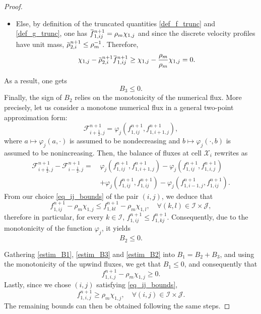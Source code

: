 \documentclass[reqno]{amsart}
\newcommand{\II}{\mathcal{I}}
\newcommand{\J}{\mathcal{J}}
\newcommand{\iph}{{i+\frac{1}{2}}}
\newcommand{\imh}{{i-\frac{1}{2}}}
\newcommand{\inv}{^{-1}}
\newcommand{\overbar}[1]{\mkern 1.5mu\overline{\mkern-1.5mu#1\mkern-1.5mu}\mkern 1.5mu}
\numberwithin{equation}{section}
\begin{document}
\begin{proof}
\begin{itemize}
        \item Else, by definition of the truncated quantities \eqref{def_f_trunc} and \eqref{def_g_trunc}, one has $\overbar{f}_{1,ij}^{n+1} = \rho_m\chi_{1,j}$ and since the discrete velocity profiles have unit mass, $\overbar{\rho}_{2,i}^{n+1}\leq\rho_m\inv$. Therefore, 
        \begin{equation*}
            \chi_{1,j}-\overbar{\rho}_{2,i}^{n+1}\overbar{f}_{1,ij}^{n+1} \geq \chi_{1,j}-\frac{\rho_m}{\rho_m}\chi_{1,j}= 0.
        \end{equation*}
    \end{itemize}
    As a result, one gets
    \begin{equation}\label{estim_B3}
        B_3\leq 0.
    \end{equation}
    Finally, the sign of $B_2$ relies on the monotonicity of the numerical flux. More precisely, let us consider a monotone numerical flux in a general two-point approximation form: 
    \begin{equation*}
        \mathcal{F}_{\iph,j}^{n+1}=\varphi_j(f_{1,ij}^{n+1},f_{1,i+1,j}^{n+1}),
    \end{equation*}
    where $a\mapsto \varphi_j(a,\cdot)$ is assumed to be nondecreasing and $b\mapsto \varphi_j(\cdot,b)$ is assumed to be nonincreasing. Then, the balance of fluxes at cell $\mathcal{X}_i$ rewrites as
    \begin{align}\label{eq_fluxmono_varphi}
        \mathcal{F}_{\iph,j}^{n+1}-\mathcal{F}_{\imh,j}^{n+1}=\, &\varphi_j(f_{1,ij}^{n+1},f_{1,i+1,j}^{n+1}) - \varphi_j(f_{1,ij}^{n+1},f_{1,i,j}^{n+1})\nonumber\\
        & + \varphi_j(f_{1,ij}^{n+1},f_{1,ij}^{n+1}) - \varphi_j(f_{1,i-1,j}^{n+1},f_{1,ij}^{n+1}).
    \end{align}
    From our choice \eqref{eq_ij_bounds} of the pair $(i,j)$, we deduce that
    \begin{equation*}
        f_{1,ij}^{n+1} - \rho_m\chi_{1,j} \leq f_{1,kl}^{n+1} - \rho_m\chi_{1,l},\quad\forall (k,l)\in\II\times\J,
    \end{equation*}
    therefore in particular, for every $k\in\II$, $f_{1,ij}^{n+1}\leq f_{1,kj}^{n+1}$. Consequently, due to the monotonicity of the function $\varphi_j$, it yields
    \begin{equation}\label{estim_B2}
        B_2 \leq 0.
    \end{equation}

    Gathering \eqref{estim_B1}, \eqref{estim_B3} and \eqref{estim_B2} into $B_1=B_2+B_3$, and using the monotonicity of the upwind fluxes, we get that $B_1\leq0$, and consequently that
    \begin{equation*}
        f_{1,i,j}^{n+1} - \rho_m\chi_{1,j} \geq 0.
    \end{equation*}
    Lastly, since we chose $(i,j)$ satisfying \eqref{eq_ij_bounds}, 
    \begin{equation*}
        f_{1,i,j}^{n+1} \geq \rho_m\chi_{1,j},\quad \forall (i,j)\in\II\times\J.
    \end{equation*}
    The remaining bounds can then be obtained following the same steps.
\end{proof}
\end{document}
